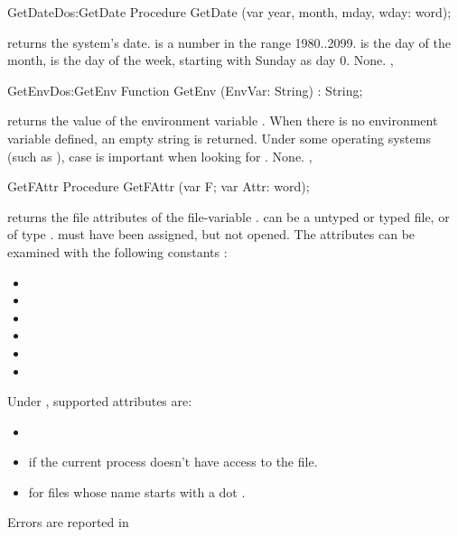 \begin{procedurel}{GetDate}{Dos:GetDate}
\Declaration
Procedure GetDate (var year, month, mday, wday: word);\Description

 returns the system's date.  is a number in the range
1980..2099. is the day of the month,
 is the day of the week, starting with Sunday as day 0.
\Errors
None.
\SeeAlso
{},
\end{procedurel}


\begin{functionl}{GetEnv}{Dos:GetEnv}
\Declaration
Function GetEnv (EnvVar: String) : String;
\Description

 returns the value of the environment variable .
When there is no environment variable  defined, an empty
string is returned.
\Portability
Under some operating systems (such as \unix), case is important when looking
for .
\Errors
None.
\SeeAlso
{}, 
\end{functionl}


\begin{procedure}{GetFAttr}
\Declaration
Procedure GetFAttr (var F; var Attr: word);
\Description

 returns the file attributes of the file-variable .
  can be a untyped or typed file, or of type .  must
have been assigned, but not opened. The attributes can be examined with the
following constants :
\begin{itemize}
\item {}
\item {}
\item {}
\item {}
\item {}
\item {}
\end{itemize}
Under \linux, supported attributes are:
\begin{itemize}
\item {}
\item {} if the current process doesn't have access to the file.
\item {} for files whose name starts with a dot .
\end{itemize}

\Errors
Errors are reported in 
\SeeAlso
{}
\end{procedure}

